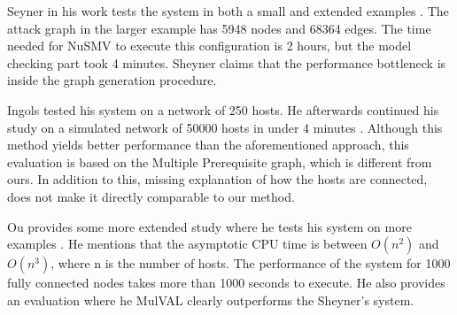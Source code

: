 Seyner in his work tests the system in both a small and extended examples \cite{sheyner2002automated}. The attack graph in the larger example has 5948 nodes and 68364 edges. The time needed for NuSMV to execute this configuration is 2 hours, but the model checking part took 4 minutes. Sheyner claims that the performance bottleneck is inside the graph generation procedure. 

Ingols tested his system on a network of 250 hosts. He afterwards continued his study on a simulated network of 50000 hosts in under 4 minutes \cite{ingols2006practical}. Although this method yields better performance than the aforementioned approach, this evaluation is based on the Multiple Prerequisite graph, which is different from ours. In addition to this, missing explanation of how the hosts are connected, does not make it directly comparable to our method.

Ou provides some more extended study where he tests his system on more examples \cite{ou2006scalable}. He mentions that the asymptotic CPU time is between $O(n^2)$ and $O(n^3)$, where n is the number of hosts. The performance of the system for 1000 fully connected nodes takes more than 1000 seconds to execute. He also provides an evaluation where he MulVAL clearly outperforms the Sheyner's system.



